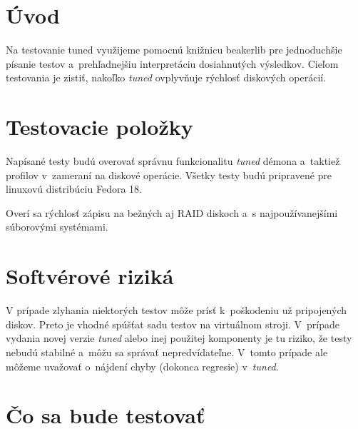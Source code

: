 \section{Úvod}

Na testovanie tuned využijeme pomocnú knižnicu beakerlib
\cite{beakerlibHomepage} pre jednoduchšie písanie testov a~prehľadnejšiu
interpretáciu dosiahnutých výsledkov. Cieľom testovania je zistiť, nakoľko
\emph{tuned} ovplyvňuje rýchlosť diskových operácií.

\section{Testovacie položky}

Napísané testy budú overovať správnu funkcionalitu \emph{tuned} démona a~taktiež
profilov v~zameraní na diskové operácie. Všetky testy budú
pripravené pre linuxovú distribúciu Fedora 18\cite{fedoraHomepage}.

Overí sa rýchlosť zápisu na bežných aj RAID diskoch a~s najpoužívanejšími
súborovými systémami.

\section{Softvérové riziká}
\label{sec:softverove-rizika}

V prípade zlyhania niektorých testov môže prísť k~poškodeniu už pripojených
diskov. Preto je vhodné spúšťat sadu testov na virtuálnom stroji. V~prípade
vydania novej verzie \emph{tuned} alebo inej použitej komponenty je tu riziko,
že testy nebudú stabilné a~môžu sa správať nepredvídateľne. V~tomto prípade ale
môžeme uvažovať o~nájdení chyby (dokonca regresie) v~\emph{tuned}.

\section{Čo sa bude testovať}

